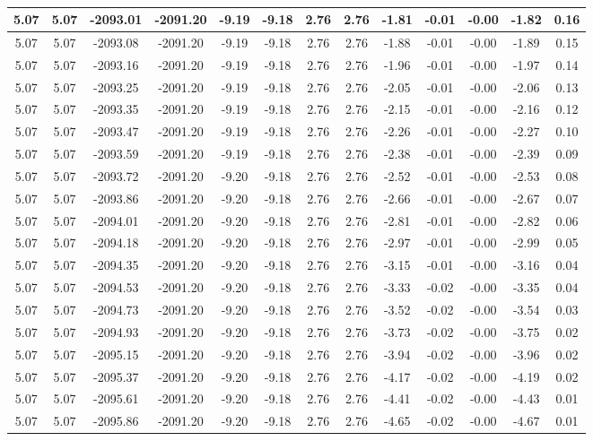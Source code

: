 \begin{table}[htbp]
\begin{adjustbox}{angle=90}
\begin{tabular}{|c|c|c|c|c|c|c|c|c|c|c|c|c|}
 5.07 & 5.07 & -2093.01 & -2091.20 & -9.19 & -9.18 & 2.76 & 2.76 & -1.81 & -0.01 & -0.00 & -1.82 & 0.16\\ \hline
 5.07 & 5.07 & -2093.08 & -2091.20 & -9.19 & -9.18 & 2.76 & 2.76 & -1.88 & -0.01 & -0.00 & -1.89 & 0.15\\ \hline
 5.07 & 5.07 & -2093.16 & -2091.20 & -9.19 & -9.18 & 2.76 & 2.76 & -1.96 & -0.01 & -0.00 & -1.97 & 0.14\\ \hline
 5.07 & 5.07 & -2093.25 & -2091.20 & -9.19 & -9.18 & 2.76 & 2.76 & -2.05 & -0.01 & -0.00 & -2.06 & 0.13\\ \hline
 5.07 & 5.07 & -2093.35 & -2091.20 & -9.19 & -9.18 & 2.76 & 2.76 & -2.15 & -0.01 & -0.00 & -2.16 & 0.12\\ \hline
 5.07 & 5.07 & -2093.47 & -2091.20 & -9.19 & -9.18 & 2.76 & 2.76 & -2.26 & -0.01 & -0.00 & -2.27 & 0.10\\ \hline
 5.07 & 5.07 & -2093.59 & -2091.20 & -9.19 & -9.18 & 2.76 & 2.76 & -2.38 & -0.01 & -0.00 & -2.39 & 0.09\\ \hline
 5.07 & 5.07 & -2093.72 & -2091.20 & -9.20 & -9.18 & 2.76 & 2.76 & -2.52 & -0.01 & -0.00 & -2.53 & 0.08\\ \hline
 5.07 & 5.07 & -2093.86 & -2091.20 & -9.20 & -9.18 & 2.76 & 2.76 & -2.66 & -0.01 & -0.00 & -2.67 & 0.07\\ \hline
 5.07 & 5.07 & -2094.01 & -2091.20 & -9.20 & -9.18 & 2.76 & 2.76 & -2.81 & -0.01 & -0.00 & -2.82 & 0.06\\ \hline
 5.07 & 5.07 & -2094.18 & -2091.20 & -9.20 & -9.18 & 2.76 & 2.76 & -2.97 & -0.01 & -0.00 & -2.99 & 0.05\\ \hline
 5.07 & 5.07 & -2094.35 & -2091.20 & -9.20 & -9.18 & 2.76 & 2.76 & -3.15 & -0.01 & -0.00 & -3.16 & 0.04\\ \hline
 5.07 & 5.07 & -2094.53 & -2091.20 & -9.20 & -9.18 & 2.76 & 2.76 & -3.33 & -0.02 & -0.00 & -3.35 & 0.04\\ \hline
 5.07 & 5.07 & -2094.73 & -2091.20 & -9.20 & -9.18 & 2.76 & 2.76 & -3.52 & -0.02 & -0.00 & -3.54 & 0.03\\ \hline
 5.07 & 5.07 & -2094.93 & -2091.20 & -9.20 & -9.18 & 2.76 & 2.76 & -3.73 & -0.02 & -0.00 & -3.75 & 0.02\\ \hline
 5.07 & 5.07 & -2095.15 & -2091.20 & -9.20 & -9.18 & 2.76 & 2.76 & -3.94 & -0.02 & -0.00 & -3.96 & 0.02\\ \hline
 5.07 & 5.07 & -2095.37 & -2091.20 & -9.20 & -9.18 & 2.76 & 2.76 & -4.17 & -0.02 & -0.00 & -4.19 & 0.02\\ \hline
 5.07 & 5.07 & -2095.61 & -2091.20 & -9.20 & -9.18 & 2.76 & 2.76 & -4.41 & -0.02 & -0.00 & -4.43 & 0.01\\ \hline
 5.07 & 5.07 & -2095.86 & -2091.20 & -9.20 & -9.18 & 2.76 & 2.76 & -4.65 & -0.02 & -0.00 & -4.67 & 0.01\\ \hline
            \end{tabular}
        \end{adjustbox}
        \caption{}
        \label{}
    \end{table}
    